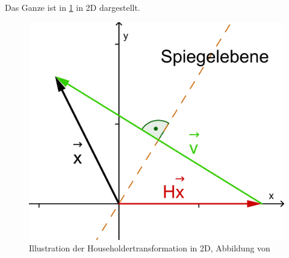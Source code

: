 Das Ganze ist in \ref{francis:abb:householder_transform} in 2D dargestellt.
\begin{figure}
	\begin{center}
		\includegraphics[scale=0.1]{papers/francis/images/Householdertransformation.png}
		\caption{Illustration der Householdertransformation in 2D, Abbildung von \cite{francis:householder}}
		\label{francis:abb:householder_transform}
	\end{center}
\end{figure}
